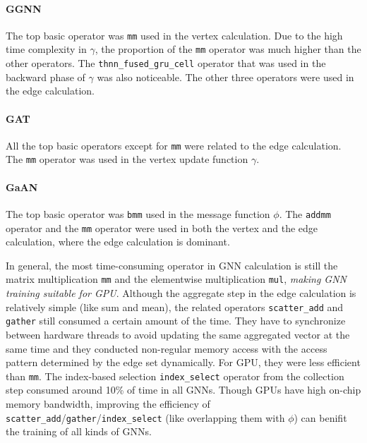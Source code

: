 \paragraph{GGNN}
The top basic operator was \texttt{mm} used in the vertex calculation.
Due to the high time complexity in $\gamma$, the proportion of the \texttt{mm} operator was much higher than the other operators.
The \texttt{thnn\_fused\_gru\_cell} operator that was used in the backward phase of $\gamma$ was also noticeable.
The other three operators were used in the edge calculation.

\paragraph{GAT}
All the top basic operators except for \texttt{mm} were related to the edge calculation.
The \texttt{mm} operator was used in the vertex update function $\gamma$.

\paragraph{GaAN}
The top basic operator was \texttt{bmm} used in the message function $\phi$.
The \texttt{addmm} operator and the \texttt{mm} operator were used in both the vertex and the edge calculation, where the edge calculation is dominant.

In general, the most time-consuming operator in GNN calculation is still the matrix multiplication \texttt{mm} and the elementwise multiplication \texttt{mul}, \emph{making GNN training suitable for GPU}.
Although the aggregate step in the edge calculation is relatively simple (like sum and mean), the related operators \texttt{scatter\_add} and \texttt{gather} still consumed a certain amount of the time.
They have to synchronize between hardware threads to avoid updating the same aggregated vector at the same time and they conducted non-regular memory access with the access pattern determined by the edge set dynamically.
For GPU, they were less efficient than \texttt{mm}.
The index-based selection \texttt{index\_select} operator from the collection step consumed around 10\% of time in all GNNs.
Though GPUs have high on-chip memory bandwidth, improving the efficiency of \texttt{scatter\_add}/\texttt{gather}/\texttt{index\_select} (like overlapping them with $\phi$) can benifit the training of all kinds of GNNs.

